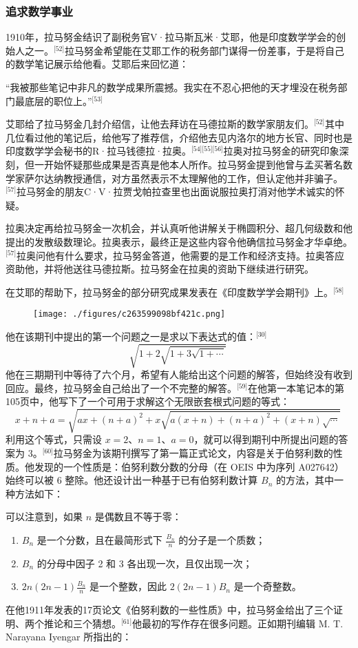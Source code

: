 \subsubsection{追求数学事业}
1910年，拉马努金结识了副税务官V·拉马斯瓦米·艾耶，他是印度数学学会的创始人之一。\(^\text{[52]}\)拉马努金希望能在艾耶工作的税务部门谋得一份差事，于是将自己的数学笔记展示给他看。艾耶后来回忆道：

“我被那些笔记中非凡的数学成果所震撼。我实在不忍心把他的天才埋没在税务部门最底层的职位上。”\(^\text{[53]}\)

艾耶给了拉马努金几封介绍信，让他去拜访在马德拉斯的数学家朋友们。\(^\text{[52]}\)其中几位看过他的笔记后，给他写了推荐信，介绍他去见内洛尔的地方长官、同时也是印度数学学会秘书的R·拉马钱德拉·拉奥。\(^\text{[54][55][56]}\)拉奥对拉马努金的研究印象深刻，但一开始怀疑那些成果是否真是他本人所作。拉马努金提到他曾与孟买著名数学家萨尔达纳教授通信，对方虽然表示不太理解他的工作，但认定他并非骗子。\(^\text{[57]}\)拉马努金的朋友C·V·拉贾戈帕拉查里也出面说服拉奥打消对他学术诚实的怀疑。

拉奥决定再给拉马努金一次机会，并认真听他讲解关于椭圆积分、超几何级数和他提出的发散级数理论。拉奥表示，最终正是这些内容令他确信拉马努金才华卓绝。\(^\text{[57]}\)拉奥问他有什么要求，拉马努金答道，他需要的是工作和经济支持。拉奥答应资助他，并将他送往马德拉斯。拉马努金在拉奥的资助下继续进行研究。

在艾耶的帮助下，拉马努金的部分研究成果发表在《印度数学学会期刊》上。\(^\text{[58]}\)
\begin{figure}[ht]
\centering
\texttt{[image: ./figures/c263599098bf421c.png]}
\caption{} \label{fig_LMLJ_4}
\end{figure}
他在该期刊中提出的第一个问题之一是求以下表达式的值：\(^\text{[30]}\)
$$
\sqrt{1 + 2 \sqrt{1 + 3 \sqrt{1 + \cdots}}}~
$$
他在三期期刊中等待了六个月，希望有人能给出这个问题的解答，但始终没有收到回应。最终，拉马努金自己给出了一个不完整的解答。\(^\text{[59]}\)在他第一本笔记本的第105页中，他写下了一个可用于求解这个无限嵌套根式问题的等式：
$$
x + n + a = \sqrt{ax + (n + a)^2 + x \sqrt{a(x + n) + (n + a)^2 + (x + n) \sqrt{\cdots}}}~
$$
利用这个等式，只需设 $x = 2$、$n = 1$、$a = 0$，就可以得到期刊中所提出问题的答案为 3。\(^\text{[60]}\)拉马努金为该期刊撰写了第一篇正式论文，内容是关于伯努利数的性质。他发现的一个性质是：伯努利数分数的分母（在 OEIS 中为序列 A027642）始终可以被 6 整除。他还设计出一种基于已有伯努利数计算 $B_n$ 的方法，其中一种方法如下：

可以注意到，如果 $n$ 是偶数且不等于零：
\begin{enumerate}
\item $B_n$ 是一个分数，且在最简形式下 $\frac{B_n}{n}$ 的分子是一个质数；
\item $B_n$ 的分母中因子 2 和 3 各出现一次，且仅出现一次；
\item $2n(2n - 1)\frac{B_n}{n}$ 是一个整数，因此 $2(2n - 1)B_n$ 是一个奇整数。
\end{enumerate}
在他1911年发表的17页论文《伯努利数的一些性质》中，拉马努金给出了三个证明、两个推论和三个猜想。\(^\text{[61]}\)他最初的写作存在很多问题。正如期刊编辑 M. T. Narayana Iyengar 所指出的：

